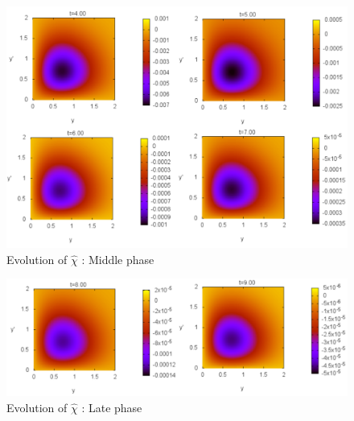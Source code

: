 \documentclass{article}
\begin{document}
\begin{figure}[H]
\begin{center}
   \includegraphics[scale=0.4]{plots/Plotpanel2.pdf} 
  \caption{Evolution of $\hat{\chi}$ : Middle phase}
  \label{Panel2}
 \end{center}
\end{figure}  
\begin{figure}[H]
\begin{center}
   \includegraphics[scale=0.4]{plots/Plotpanel3.pdf} 
  \caption{Evolution of $\hat{\chi}$ : Late phase}
  \label{Panel3}
 \end{center}
\end{figure}  
\end{document}

